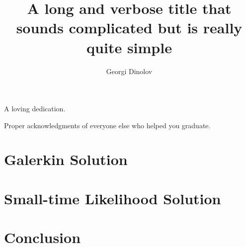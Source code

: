 



\title{A long and verbose title that sounds complicated but is really quite simple}
\author{Georgi Dinolov}
\deanlinethree{}

\begin{frontmatter}
\maketitle

\copyrightpage

\tableofcontents

\listoffigures

\listoftables

\begin{abstract}

\end{abstract}

\begin{dedication}
\vspace*{\fill}
\begin{center}
A loving dedication.
\end{center}
\vspace*{\fill}
\end{dedication}

\begin{acknowledgements}
Proper acknowledgments of everyone else who helped you graduate.
\end{acknowledgements}

\end{frontmatter}

\chapter{Galerkin Solution}


\chapter{Small-time Likelihood Solution}


\chapter{Conclusion}



\nocite{*}

\singlespacing

\doublespacing

